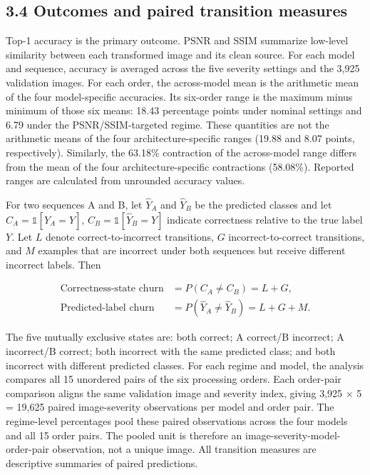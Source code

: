 \documentclass[10pt,twocolumn]{article}
\begin{document}
\subsection{3.4 Outcomes and paired transition
measures}\label{outcomes-and-paired-transition-measures}

Top-1 accuracy is the primary outcome. PSNR and SSIM summarize low-level
similarity between each transformed image and its clean source. For each
model and sequence, accuracy is averaged across the five severity
settings and the 3,925 validation images. For each order, the
across-model mean is the arithmetic mean of the four model-specific
accuracies. Its six-order range is the maximum minus minimum of those
six means: 18.43 percentage points under nominal settings and 6.79 under
the PSNR/SSIM-targeted regime. These quantities are not the arithmetic
means of the four architecture-specific ranges (19.88 and 8.07 points,
respectively). Similarly, the 63.18\% contraction of the across-model
range differs from the mean of the four architecture-specific
contractions (58.08\%). Reported ranges are calculated from unrounded
accuracy values.

For two sequences A and B, let \(\hat{Y}_A\) and \(\hat{Y}_B\) be the
predicted classes and let \(C_A=\mathbb{1}[\hat{Y}_A=Y]\),
\(C_B=\mathbb{1}[\hat{Y}_B=Y]\) indicate correctness relative to the
true label \(Y\). Let \(L\) denote correct-to-incorrect transitions,
\(G\) incorrect-to-correct transitions, and \(M\) examples that are
incorrect under both sequences but receive different incorrect labels.
Then

\[
\begin{aligned}
\text{Correctness-state churn} &= P(C_A\ne C_B)=L+G,\\
\text{Predicted-label churn} &= P(\hat{Y}_A\ne\hat{Y}_B)=L+G+M.
\end{aligned}
\]

The five mutually exclusive states are: both correct; A correct/B
incorrect; A incorrect/B correct; both incorrect with the same predicted
class; and both incorrect with different predicted classes. For each
regime and model, the analysis compares all 15 unordered pairs of the
six processing orders. Each order-pair comparison aligns the same
validation image and severity index, giving 3,925 × 5 = 19,625 paired
image-severity observations per model and order pair. The regime-level
percentages pool these paired observations across the four models and
all 15 order pairs. The pooled unit is therefore an
image-severity-model-order-pair observation, not a unique image. All
transition measures are descriptive summaries of paired predictions.
\end{document}
